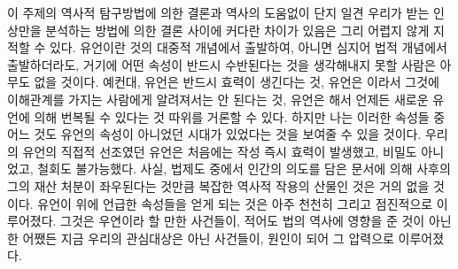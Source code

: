 이 주제의 역사적 탐구방법에 의한 결론과
역사의 도움없이 단지
일견 우리가 받는 인상만을 분석하는 방법에 의한
결론 사이에
커다란 차이가 있음은 그리 어렵지 않게 지적할 수 있다.
유언이란 것의 대중적 개념에서 출발하여,
아니면 심지어 법적 개념에서 출발하더라도,
거기에 어떤 속성이 반드시 수반된다는 것을 생각해내지 못할 사람은
아무도 없을 것이다.
예컨대, 유언은 반드시 
효력이 생긴다는 것, 유언은 이라서
그것에 이해관계를 가지는 사람에게 알려져서는 안 된다는 것,
유언은 해서
언제든 새로운 유언에 의해 번복될 수 있다는 것 따위를 거론할 수 있다.
하지만 나는 이러한 속성들 중 어느 것도 유언의 속성이 아니었던 시대가
있었다는 것을 보여줄 수 있을 것이다.
우리의 유언의 직접적 선조였던 유언은 처음에는
작성 즉시 효력이 발생했고, 비밀도 아니었고, 철회도 불가능했다.
사실,
법제도 중에서
인간의 의도를 담은 문서에 의해 사후의 그의 재산 처분이
좌우된다는 것만큼 복잡한 역사적 작용의 산물인 것은 거의 없을 것이다.
유언이
위에 언급한 속성들을 얻게 되는 것은
아주 천천히 그리고 점진적으로 이루어졌다.
그것은
우연이라 할 만한 사건들이,
적어도 법의 역사에 영향을 준 것이 아닌 한
어쨌든 지금 우리의 관심대상은 아닌 사건들이,
원인이 되어 그 압력으로 이루어졌다.

